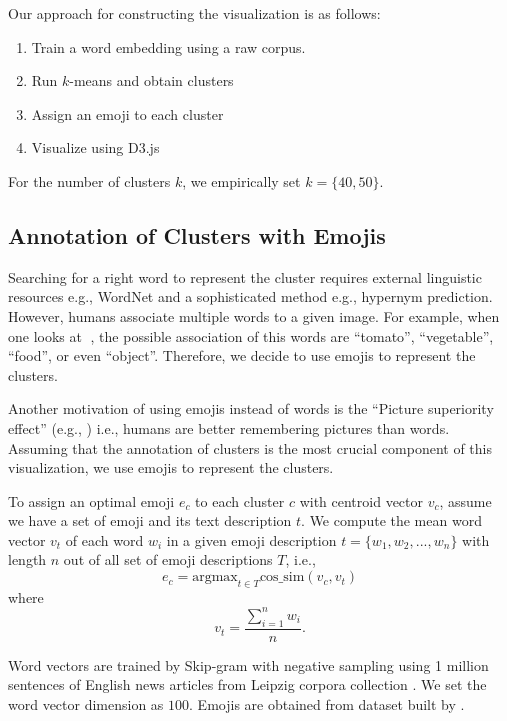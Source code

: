 Our approach for constructing the visualization is as follows:
\begin{enumerate}
 \item Train a word embedding using a raw corpus. 
 \item Run $k$-means \cite{lloyd1982least} and obtain clusters
 \item Assign an emoji to each cluster
 \item Visualize using D3.js
\end{enumerate}
For the number of clusters $k$, we empirically set $k = \{40, 50\}$.

\subsection{Annotation of Clusters with Emojis}
Searching for a right word to represent the cluster requires external linguistic resources e.g., WordNet and a sophisticated method e.g., hypernym prediction. 
However, humans associate multiple words to a given image.  
For example, when one looks at 🍅, the possible association of this words are ``tomato'', ``vegetable'', ``food'', or even ``object''. 
Therefore, we decide to use emojis to represent the clusters. 

Another motivation of using emojis instead of words is the ``Picture superiority effect'' (e.g., \cite{doi:10.1162/jocn.2010.21464}) i.e., humans are better remembering pictures than words. 
Assuming that the annotation of clusters is the most crucial component of this visualization, we use emojis to represent the clusters.  

To assign an optimal emoji $e_c$ to each cluster $c$ with centroid vector $v_c$, assume we have a set of emoji and its text description $t$. 
We compute the mean word vector $v_t$ of each word $w_i$ in a given emoji description $t = \{w_1, w_2, ..., w_n\}$ with length $n$ out of all set of emoji descriptions $T$, i.e.,
\begin{equation}
 e_c =  \text{argmax}_{t \in T} \text{cos\_sim}(v_c, v_t)
\end{equation}
where 
\begin{equation}
 v_t = \frac{\sum_{i = 1}^{n} w_i}{n}. 
\end{equation}

Word vectors are trained by Skip-gram with negative sampling \cite{NIPS2013_5021} using 1 million sentences of English news articles from Leipzig corpora collection \cite{Goldhahn12buildinglarge}. We set the word vector dimension as $100$. 
Emojis are obtained from dataset built by \cite{eisner-EtAl:2016:SocialNLP}. 


